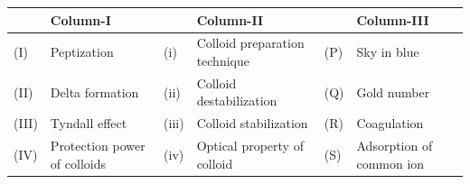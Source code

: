 \documentclass[10pt]{extarticle}
\begin{document}
\begin{center}\small\setlength{\tabcolsep}{4pt}
\begin{tabular}{|p{0.8cm}|p{3.8cm}|p{0.9cm}|p{4.6cm}|p{0.9cm}|p{3.6cm}|}\hline
 & \textbf{Column-I} & & \textbf{Column-II} & & \textbf{Column-III}\\\hline
(I) & Peptization & (i) & Colloid preparation technique & (P) & Sky in blue\\\hline
(II) & Delta formation & (ii) & Colloid destabilization & (Q) & Gold number\\\hline
(III) & Tyndall effect & (iii) & Colloid stabilization & (R) & Coagulation\\\hline
(IV) & Protection power of colloids & (iv) & Optical property of colloid & (S) & Adsorption of common ion\\\hline
\end{tabular}
\end{center}
\end{document}
